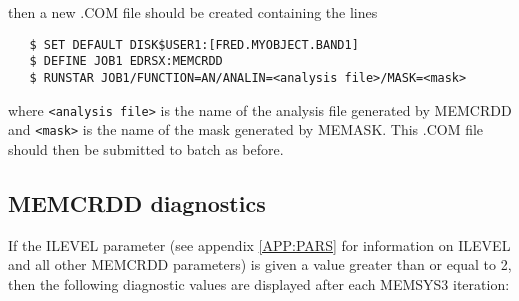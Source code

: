 then a new .COM file should be created containing the lines

\begin{verbatim}
   $ SET DEFAULT DISK$USER1:[FRED.MYOBJECT.BAND1]
   $ DEFINE JOB1 EDRSX:MEMCRDD
   $ RUNSTAR JOB1/FUNCTION=AN/ANALIN=<analysis file>/MASK=<mask>
\end{verbatim}

where \verb+<analysis file>+ is the name of the analysis file generated by
MEMCRDD and \verb+<mask>+ is the name of the mask generated by MEMASK. This
.COM file should then  be submitted to batch as before.

\subsection {MEMCRDD diagnostics}
\label {SEC:DIAG}
If the ILEVEL parameter (see appendix \ref {APP:PARS} for information on ILEVEL
and all other MEMCRDD parameters) is given a value greater than or equal to 2,
then the following diagnostic values are displayed after each MEMSYS3 iteration:

